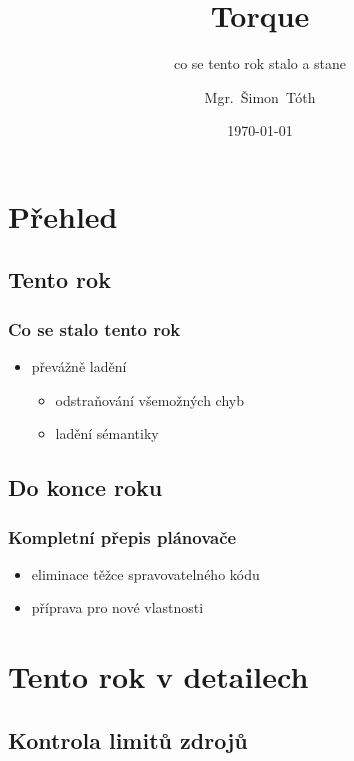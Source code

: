 \documentclass[pdftex,aspectratio=169]{beamer}
\title{Torque}
\subtitle{co se tento rok stalo a stane}
\author[]{Mgr.~Šimon~Tóth}
\date{\today}
\begin{document}
\begin{frame}
	\titlepage
\end{frame}

\section{Přehled}
\subsection{Tento rok}

\begin{frame}
	\frametitle{Co se stalo tento rok}
	\begin{itemize}
		\item{převážně ladění}
		\begin{itemize}
			\item{odstraňování všemožných chyb}
			\item{ladění sémantiky}
		\end{itemize}
	\end{itemize}
\end{frame}

\subsection{Do konce roku}

\begin{frame}
	\frametitle{Kompletní přepis plánovače}
	\begin{itemize}
		\item{eliminace těžce spravovatelného kódu}
		\item{příprava pro nové vlastnosti}
	\end{itemize}
\end{frame}

\section{Tento rok v detailech}
\subsection{Kontrola limitů zdrojů}




\end{document}
